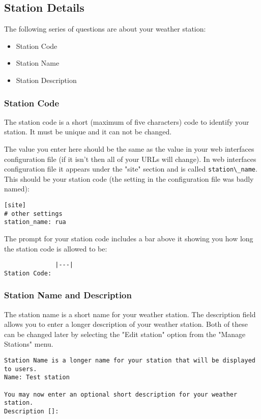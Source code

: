 \documentclass[a4paper,10pt,draft]{book}
\begin{document}
\subsection{Station Details}
The following series of questions are about your weather station:
\begin{itemize}
\item Station Code
\item Station Name
\item Station Description
\end{itemize}

\subsubsection{Station Code}
The station code is a short (maximum of five characters) code to identify your station. It must be unique and it can not be changed.

The value you enter here should be the same as the value in your web interfaces configuration file (if it isn't then all of your URLs will change). In web interfaces configuration file it appears under the "site" section and is called \verb|station\_name|. This should be your station code (the setting in the configuration file was badly named):
\begin{verbatim}
[site]
# other settings
station_name: rua
\end{verbatim}

The prompt for your station code includes a bar above it showing you how long the station code is allowed to be:
\begin{verbatim}
              |---|
Station Code:
\end{verbatim}

\subsubsection{Station Name and Description}
The station name is a short name for your weather station. The description field allows you to enter a longer description of your weather station. Both of these can be changed later by selecting the "Edit station" option from the "Manage Stations" menu.

\begin{verbatim}
Station Name is a longer name for your station that will be displayed 
to users.
Name: Test station

You may now enter an optional short description for your weather
station.
Description []:
\end{verbatim}
\end{document}
